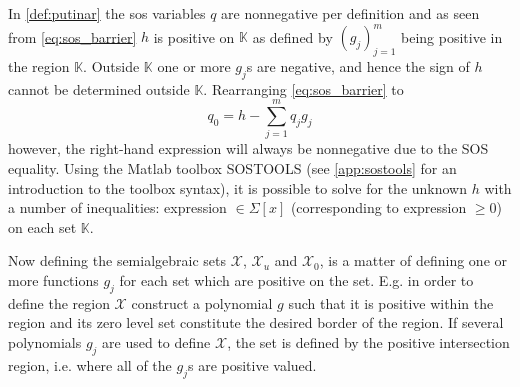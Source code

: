 


In \autoref{def:putinar} the \gls{sos} variables $q$ are nonnegative per definition and as seen from \autoref{eq:sos_barrier} $h$ is positive on $\mathbb{K}$ as defined by $(g_j)_{j=1}^m$ being positive  in the region $\mathbb{K}$. Outside $\mathbb{K}$ one or more $g_j$s are negative, and hence the sign of $h$ cannot be determined outside $\mathbb{K}$.
Rearranging \autoref{eq:sos_barrier} to
\begin{equation}
q_0 = h - \sum _{j=1}^{m}q_jg_j \label{eq:putinar_sos}
\end{equation} 
however, the right-hand expression will always be nonnegative due to the SOS equality. Using the Matlab toolbox SOSTOOLS (see \autoref{app:sostools} for an introduction to the toolbox syntax), it is possible to solve for the unknown $h$ with a number of inequalities: expression $\in\Sigma[x]$ (corresponding to expression $\geq 0$) on each set $\mathbb{K}$. 

Now defining the semialgebraic sets $\mathcal{X}$, $\mathcal{X}_u$ and $\mathcal{X}_0$, is a matter of defining one or more functions $g_j$ for each set which are positive on the set. E.g. in order to define the region $\mathcal{X}$ construct a polynomial $g$ such that it is positive within the region and its zero level set constitute the desired border of the region. If several polynomials $g_j$ are used to define $\mathcal{X}$, the set is defined by the positive intersection region, i.e. where all of the $g_j$s are positive valued.

